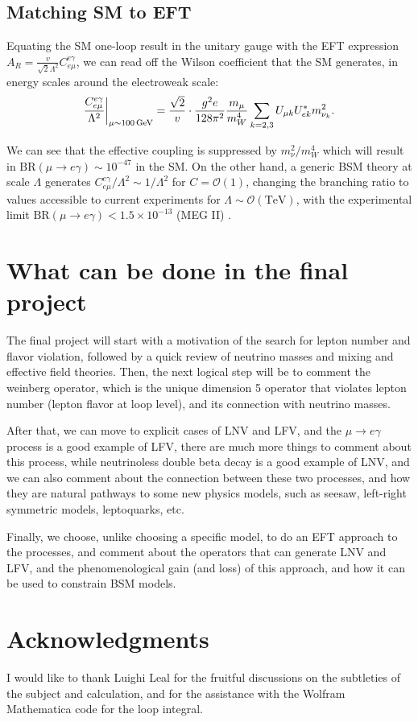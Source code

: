 \documentclass[11pt]{article}
\begin{document}
\subsection*{Matching SM to EFT}

Equating the SM one-loop result in the unitary gauge with the EFT expression $A_R = \frac{v}{\sqrt{2}\Lambda^2}C^{e\gamma}_{e\mu}$, we can read off the Wilson coefficient that the SM generates, in energy scales around the electroweak scale:
\begin{equation}
    \frac{C^{e\gamma}_{e\mu}}{\Lambda^2}\bigg|_{\rm \mu\sim 100\,\text{GeV}}
    =
    \frac{\sqrt{2}}{v}
    \cdot
    \frac{g^2 e}{128\pi^2}
    \frac{m_\mu}{m_W^4}
    \sum_{k=2,3}
    U_{\mu k}U^*_{ek}m_{\nu_k}^2.
    \label{eq:matching}
\end{equation}
 
We can see that the effective coupling is suppressed by $m_\nu^2/m_W^4$ which will result in $\text{BR}(\mu\to e\gamma)\sim 10^{-47}$ in the SM. On the other hand, a generic BSM theory at scale $\Lambda$ generates $C^{e\gamma}_{e\mu}/\Lambda^2 \sim 1/\Lambda^2$ for $C = \mathcal{O}(1)$, changing the branching ratio to values accessible to current experiments for $\Lambda \sim \mathcal{O}(\text{TeV})$, with the experimental limit $\text{BR}(\mu\to e\gamma) < 1.5\times 10^{-13}$ (MEG II) \cite{meg}.



\section*{What can be done in the final project}

The final project will start with a motivation of the search for lepton number and flavor violation, followed by a quick review of neutrino masses and mixing and effective field theories. Then, the next logical step will be to comment the weinberg operator, which is the unique dimension 5 operator that violates lepton number (lepton flavor at loop level), and its connection with neutrino masses.

After that, we can move to explicit cases of LNV and LFV, and the $\mu\to e\gamma$ process is a good example of LFV, there are much more things to comment about this process, while neutrinoless double beta decay is a good example of LNV, and we can also comment about the connection between these two processes, and how they are natural pathways to some new physics models, such as seesaw, left-right symmetric models, leptoquarks, etc.

Finally, we choose, unlike choosing a specific model, to do an EFT approach to the processes, and comment about the operators that can generate LNV and LFV, and the phenomenological gain (and loss) of this approach, and how it can be used to constrain BSM models.

\section*{Acknowledgments}
I would like to thank Luighi Leal for the fruitful discussions on the subtleties of the subject and calculation, and for the assistance with the Wolfram Mathematica code for the loop integral.
\nocite{*}


\end{document}
